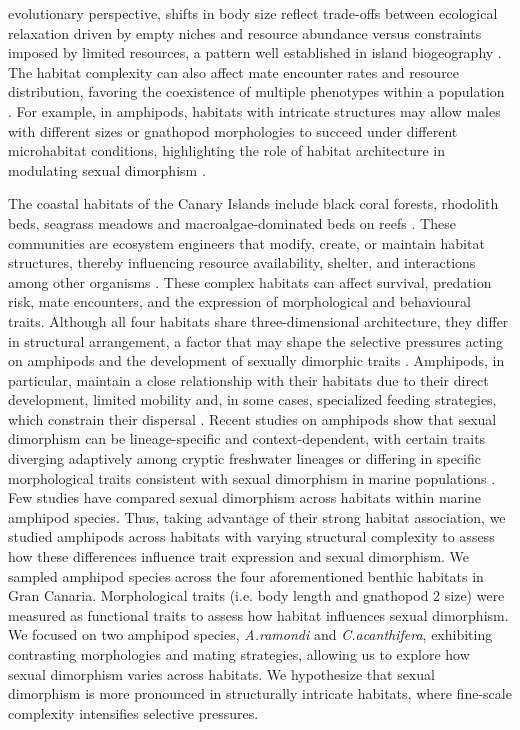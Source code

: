 \documentclass[journal,article,submit,pdftex,moreauthors]{Definitions/mdpi}
\begin{document}
evolutionary perspective, shifts in body size reflect trade-offs between ecological relaxation driven by empty niches and resource abundance versus constraints imposed by limited resources, a pattern well established in island biogeography \citep{fernandez2004introduccion}. The habitat complexity can also affect mate encounter rates and resource distribution, favoring the coexistence of multiple phenotypes within a population \citep{endler1992, shine1989}. For example, in amphipods, habitats with intricate structures may allow males with different sizes or gnathopod morphologies to succeed under different microhabitat conditions, highlighting the role of habitat architecture in modulating sexual dimorphism \citep{premate2024sexual}. 
    
 The coastal habitats of the Canary Islands include black coral forests, rhodolith beds, seagrass meadows and macroalgae-dominated beds on reefs \citep{bosch2023black, perez2023effect, alfonso2021fast, barbera2005spatial}. These communities are ecosystem engineers that modify, create, or maintain habitat structures, thereby influencing resource availability, shelter, and interactions among other organisms \citep{jones1994organisms, feldens2023can}. These complex habitats can affect survival, predation risk, mate encounters, and the expression of morphological and behavioural traits. Although all four habitats share three-dimensional architecture, they differ in structural arrangement, a factor that may shape the selective pressures acting on amphipods and the development of sexually dimorphic traits  \citep{premate2024sexual}. Amphipods, in particular, maintain a close relationship with their habitats due to their direct development, limited mobility and, in some cases, specialized feeding strategies, which constrain their dispersal \citep{fernandez2021connectivity, navarro2025inside}. Recent studies on amphipods show that sexual dimorphism can be lineage-specific and context-dependent, with certain traits diverging adaptively among cryptic freshwater lineages \citep{kabus2025morphological} or differing in specific morphological traits consistent with sexual dimorphism in marine populations \citep{song2025redescription}. Few studies have compared sexual dimorphism across habitats within marine amphipod species. Thus, taking advantage of their strong habitat association, we studied amphipods across habitats with varying structural complexity to assess how these differences influence trait expression and sexual dimorphism. We sampled amphipod species across the four aforementioned benthic habitats in Gran Canaria.  Morphological traits (i.e. body length and gnathopod 2 size) were measured as functional traits to assess how habitat influences sexual dimorphism. We focused on two amphipod species, \textit{A.ramondi} and \textit{C.acanthifera}, exhibiting contrasting morphologies and mating strategies, allowing us to explore how sexual dimorphism varies across habitats. We hypothesize that sexual dimorphism is more pronounced in structurally intricate habitats, where fine-scale complexity intensifies selective pressures.
\end{document}
